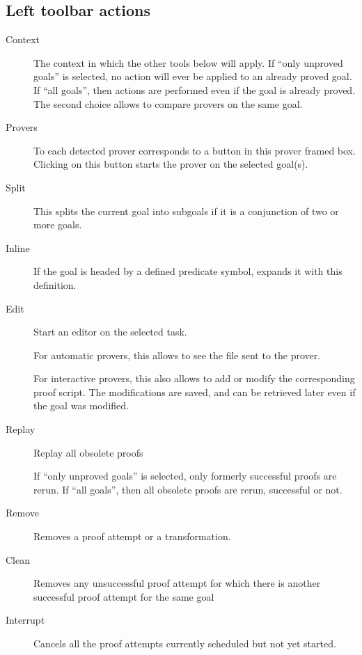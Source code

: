 \subsection{Left toolbar actions}

\begin{description}
\item[Context] The context in which the other tools below will
  apply. If ``only unproved goals'' is selected, no action will ever
  be applied to an already proved goal.  If ``all goals'', then
  actions are performed even if the goal is already proved. The second
  choice allows to compare provers on the same goal.

\item[Provers] To each detected prover corresponds to a button in this
  prover framed box. Clicking on this button starts the prover on the
  selected goal(s).

\item[Split] This splits the current goal into subgoals if it is a
  conjunction of two or more goals.

\item[Inline] If the goal is headed by a defined predicate symbol,
  expands it with this definition.

\item[Edit] Start an editor on the selected task.

  For automatic provers, this allows to see the file sent to the
  prover.

  For interactive provers, this also allows to add or modify the
  corresponding proof script. The modifications are saved, and can be
  retrieved later even if the goal was modified.

\item[Replay] Replay all obsolete proofs

  If ``only unproved goals'' is selected, only formerly successful
  proofs are rerun. If ``all goals'', then all obsolete proofs are
  rerun, successful or not.

\item[Remove] Removes a proof attempt or a transformation.

\item[Clean] Removes any unsuccessful proof attempt for which there is
  another successful proof attempt for the same goal

\item[Interrupt] Cancels all the proof attempts currently scheduled
  but not yet started.

\end{description}

